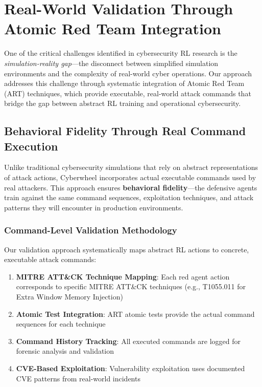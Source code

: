 
\section{Real-World Validation Through Atomic Red Team Integration}

One of the critical challenges identified in cybersecurity RL research is the \textit{simulation-reality gap}—the disconnect between simplified simulation environments and the complexity of real-world cyber operations. Our approach addresses this challenge through systematic integration of Atomic Red Team (ART) techniques, which provide executable, real-world attack commands that bridge the gap between abstract RL training and operational cybersecurity.

\subsection{Behavioral Fidelity Through Real Command Execution}

Unlike traditional cybersecurity simulations that rely on abstract representations of attack actions, Cyberwheel incorporates actual executable commands used by real attackers. This approach ensures \textbf{behavioral fidelity}—the defensive agents train against the same command sequences, exploitation techniques, and attack patterns they will encounter in production environments.

\subsubsection{Command-Level Validation Methodology}

Our validation approach systematically maps abstract RL actions to concrete, executable attack commands:

\begin{enumerate}
    \item \textbf{MITRE ATT\&CK Technique Mapping}: Each red agent action corresponds to specific MITRE ATT\&CK techniques (e.g., T1055.011 for Extra Window Memory Injection)
    
    \item \textbf{Atomic Test Integration}: ART atomic tests provide the actual command sequences for each technique
    
    \item \textbf{Command History Tracking}: All executed commands are logged for forensic analysis and validation
    
    \item \textbf{CVE-Based Exploitation}: Vulnerability exploitation uses documented CVE patterns from real-world incidents
\end{enumerate}

